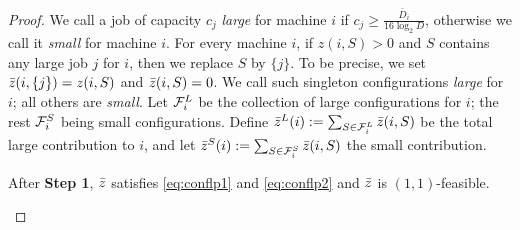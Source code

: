 \documentclass{article}[11pt]
\def\Supp{\mathsf{Supp}\xspace}
\newcommand{\bc}{{\bar c}}
\newcommand{\barD}{\bar{D}}
\begin{document}
\begin{proof}
	We call a job of capacity $c_j$ {\em large} for machine $i$ if $c_j \geq \frac{\barD_i}{16\log_2 D}$, otherwise we call it \emph{small} for machine $i$. 
	For every machine $i$, if $z(i,S) > 0$ and $S$ contains any large job $j$ for $i$, then we replace $S$ by $\{j\}$. To be precise, we set $\bar z(i,\{j\}) = z(i,S)$ and $\bar z(i,S) = 0$.
	We call such singleton configurations {\em large} for $i$; all others are {\em small}. %
	Let ${\cal F}^L_i$ be the collection of large configurations for $i$; the rest ${\cal F}^S_i$ being small configurations.
	Define $\bar z^L(i) := \sum_{S\in {\cal F}^L_i} \bar z(i,S)$ be the total large contribution to $i$, and let $\bar z^S(i) := \sum_{S\in {\cal F}^S_i} \bar z(i,S)$ the small contribution.
	
	\begin{claim}\label{clm:step1}
		After {\bf Step 1}, $\bar z$ satisfies \eqref{eq:conflp1} and \eqref{eq:conflp2} and $\bar z$ is $(1,1)$-feasible.
	\end{claim}
	
	
	
	

\end{proof}
\end{document}
